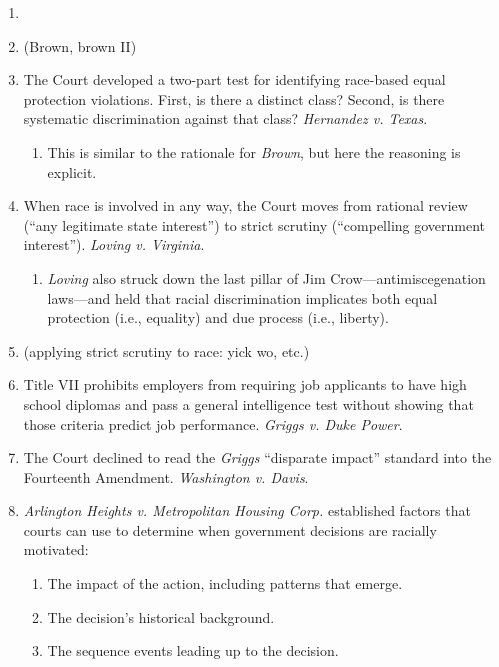 \begin{enumerate}
    \item %
    \item (Brown, brown II) %
    \item The Court developed a two-part test for identifying race-based equal 
    protection violations. First, is there a distinct class? Second, is there 
    systematic discrimination against that class? \emph{Hernandez v. Texas}.
    \begin{enumerate}
        \item This is similar to the rationale for \emph{Brown}, but here the 
        reasoning is explicit.
    \end{enumerate}
    \item When race is involved in any way, the Court moves from rational 
    review (``any legitimate state interest'') to strict scrutiny 
    (``compelling government interest''). \emph{Loving v. Virginia}.
    \begin{enumerate}
        \item \emph{Loving} also struck down the last pillar of Jim 
        Crow---antimiscegenation laws---and held that racial discrimination 
        implicates both equal protection (i.e., equality) and due process 
        (i.e., liberty).
    \end{enumerate}
    \item (applying strict scrutiny to race: yick wo, etc.) %
    \item Title VII prohibits employers from requiring job applicants to have 
    high school diplomas and pass a general intelligence test without showing 
    that those criteria predict job performance. \emph{Griggs v. Duke Power}.
    \item The Court declined to read the \emph{Griggs} ``disparate impact'' 
    standard into the Fourteenth Amendment. \emph{Washington v. Davis}.
    \item \emph{Arlington Heights v. Metropolitan Housing Corp.} established 
    factors that courts can use to determine when government decisions are 
    racially motivated:
    \begin{enumerate}
        \item The impact of the action, including patterns that emerge.
        \item The decision's historical background.
        \item The sequence events leading up to the decision.

\end{enumerate}
\end{enumerate}

